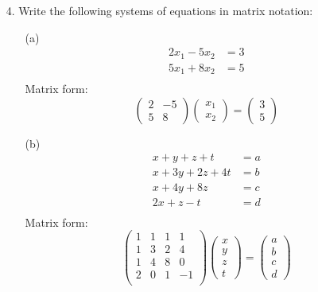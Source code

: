 \documentclass{article}
\begin{document}
\begin{enumerate}
    \item[4. ] Write the following systems of equations in matrix notation:
        \begin{enumerate}
            \item[(a)]
            \begin{align*}
                2x_1 - 5x_2 &= 3 \\
                5x_1 + 8x_2 &= 5 \\
            \end{align*}
            Matrix form:
            \begin{equation*}
                \begin{pmatrix}2 &-5\\5 &8\end{pmatrix}
                \begin{pmatrix}x_1\\x_2\end{pmatrix}   
                = \begin{pmatrix}3\\5\end{pmatrix}   
            \end{equation*}
            
            \item[(b)]
            \begin{align*}
                x + y + z + t    &= a \\
                x + 3y + 2z + 4t &= b \\
                x + 4y + 8z      &= c \\
                2x + z - t       &= d \\
            \end{align*}
            Matrix form:
            \begin{equation*}
                \begin{pmatrix}
                    1 &1 &1 &1\\
                    1 &3 &2 &4\\
                    1 &4 &8 &0\\
                    2 &0 &1 &-1\\
                \end{pmatrix}
                \begin{pmatrix}x\\y\\z\\t\end{pmatrix}
                = \begin{pmatrix}a\\b\\c\\d\end{pmatrix}
            \end{equation*}
            

\end{enumerate}
\end{enumerate}
\end{document}
